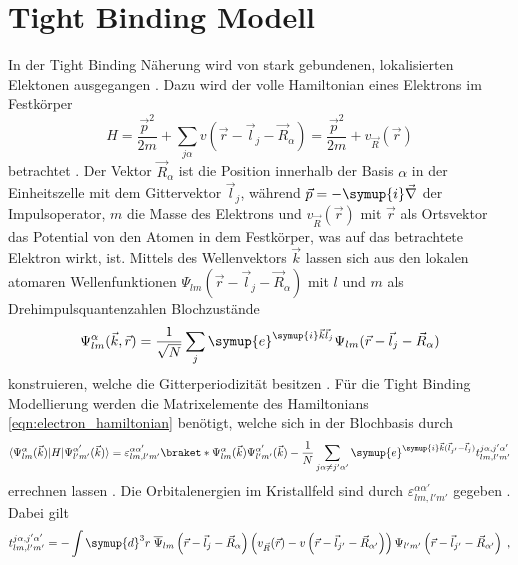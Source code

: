 \section{Tight Binding Modell}
\label{sec:tightbinding}
In der Tight Binding Näherung wird von stark gebundenen, lokalisierten Elektonen ausgegangen \cite{Czycholl}.
Dazu wird der volle Hamiltonian eines Elektrons im Festkörper
\begin{equation}
    H = \frac{\vec{p}^2}{2m} + \sum_{j\alpha} v(\vec{r}-\vec{l}_j - \vec{R}_{\alpha}) = \frac{\vec{p}^2}{2m} + v_{\vec{R}}(\vec{r})\label{eqn:electron_hamiltonian}
\end{equation}
betrachtet \cite{Czycholl}.
Der Vektor $\vec{R}_{\alpha}$ ist die Position innerhalb der Basis $\alpha$ in der Einheitszelle mit dem Gittervektor $\vec{l}_j$, während
$\vec{p} = -\symup{i}\vec{\nabla}$ der Impulsoperator, $m$ die Masse des Elektrons und $v_{\vec{R}}(\vec{r})$ mit $\vec{r}$ als Ortsvektor das Potential von den Atomen in dem Festkörper, 
was auf das betrachtete Elektron wirkt, ist.
Mittels des Wellenvektors $\vec{k}$ lassen sich aus den lokalen atomaren Wellenfunktionen $\Psi_{lm} \left (\vec{r}-\vec{l}_j - \vec{R}_{\alpha} \right )$ mit $l$ und $m$ als Drehimpulsquantenzahlen
Blochzustände
\begin{equation}
    \Psi^{\alpha}_{lm}(\vec{k}, \vec{r}) = \frac{1}{\sqrt{N}} \sum_{j} \symup{e}^{\symup{i}\vec{k}\vec{l}_j} \Psi_{lm}(\vec{r}-\vec{l}_j - \vec{R}_{\alpha}) 
\end{equation}
konstruieren, welche die Gitterperiodizität besitzen \cite{SC_literature}.
Für die Tight Binding Modellierung werden die Matrixelemente des Hamiltonians \eqref{eqn:electron_hamiltonian}
benötigt, welche sich in der Blochbasis durch
\begin{equation*}
    \bra{\Psi^{\alpha}_{lm}(\vec{k})} H \ket{\Psi^{\alpha'}_{l'm'}(\vec{k})} = \varepsilon_{lm,l'm'}^{\alpha \alpha'} \braket*{\Psi^{\alpha}_{lm}(\vec{k})}{\Psi^{\alpha'}_{l'm'}(\vec{k})}
    - \frac{1}{N} \sum_{j\alpha \neq j' \alpha'} \symup{e}^{\symup{i}\vec{k}(\vec{l}_{j'}-\vec{l}_{j})}  t^{j\alpha,j'\alpha'}_{lm,l'm'}
\end{equation*}
errechnen lassen \cite{SC_literature, Czycholl}.
Die Orbitalenergien im Kristallfeld sind durch $\varepsilon_{lm,l'm'}^{\alpha \alpha'}$ gegeben \cite{SC_literature}.
Dabei gilt
\begin{equation*}
    t^{j\alpha,j'\alpha'}_{lm,l'm'} = - \int \symup{d}^3r \; \overline{\Psi}_{lm} \left (\vec{r}-\vec{l}_j - \vec{R}_{\alpha} \right ) 
    \left ( v_{\vec{R}} (\vec{r}) - v \left (\vec{r} - \vec{l}_{j'} - \vec{R}_{\alpha'} \right )   \right ) \Psi_{l'm'} \left (\vec{r}-\vec{l}_{j'} - \vec{R}_{\alpha'} \right )  \; ,
\end{equation*}
